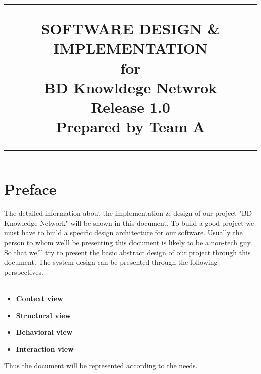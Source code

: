 \documentclass{scrreprt}
\title{%
\flushright
\rule{16cm}{5pt}\vskip1cm
\Huge{SOFTWARE DESIGN \& \\ IMPLEMENTATION}\\
\vspace{2cm}
for\\
\vspace{2cm}
BD Knowldege Netwrok\\
\vspace{2cm}
\LARGE{Release 1.0\\}
\vspace{4cm}
Prepared by Team A\\
\vfill
\rule{16cm}{5pt}
}
\date{}
\begin{document}
\cfoot{\thepage}
\maketitle
\tableofcontents
\chapter*{Preface}
The detailed information about the implementation \& design of our project "BD Knowledge Network" will be shown in this document. To build a good project we must have to build a specific design architecture for our software. Usually the person to whom we'll be presenting this document is likely to be a non-tech guy. So that we'll try to present the basic abstract design of our project through this document. The system design can be presented through the following perspectives.\\\\
\begin{itemize}
\item \textbf{Context view}
\item \textbf{Structural view}
\item \textbf{Behavioral view}
\item \textbf{Interaction view}
\end{itemize}

Thus the document will be represented according to the needs.
\end{document}
